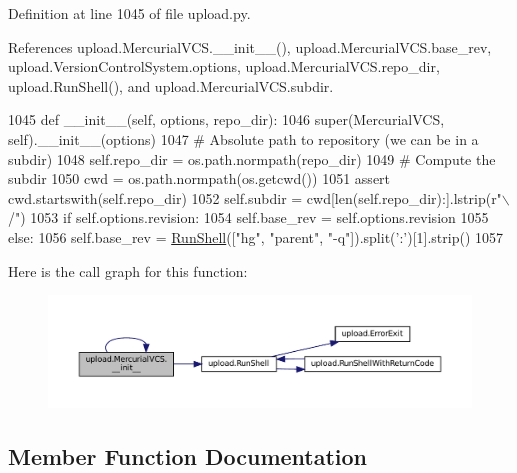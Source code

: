 Definition at line 1045 of file upload.\+py.



References upload.\+Mercurial\+V\+C\+S.\+\_\+\+\_\+init\+\_\+\+\_\+(), upload.\+Mercurial\+V\+C\+S.\+base\+\_\+rev, upload.\+Version\+Control\+System.\+options, upload.\+Mercurial\+V\+C\+S.\+repo\+\_\+dir, upload.\+Run\+Shell(), and upload.\+Mercurial\+V\+C\+S.\+subdir.


\begin{DoxyCode}
1045   \textcolor{keyword}{def }\_\_init\_\_(self, options, repo\_dir):
1046     super(MercurialVCS, self).\_\_init\_\_(options)
1047     \textcolor{comment}{# Absolute path to repository (we can be in a subdir)}
1048     self.repo\_dir = os.path.normpath(repo\_dir)
1049     \textcolor{comment}{# Compute the subdir}
1050     cwd = os.path.normpath(os.getcwd())
1051     \textcolor{keyword}{assert} cwd.startswith(self.repo\_dir)
1052     self.subdir = cwd[len(self.repo\_dir):].lstrip(\textcolor{stringliteral}{r"\(\backslash\)/"})
1053     \textcolor{keywordflow}{if} self.options.revision:
1054       self.base\_rev = self.options.revision
1055     \textcolor{keywordflow}{else}:
1056       self.base\_rev = \hyperlink{namespaceupload_adddc423c49132e8879cbb25d6be2cf11}{RunShell}([\textcolor{stringliteral}{"hg"}, \textcolor{stringliteral}{"parent"}, \textcolor{stringliteral}{"-q"}]).split(\textcolor{stringliteral}{':'})[1].strip()
1057 
\end{DoxyCode}
Here is the call graph for this function\+:
\nopagebreak
\begin{figure}[H]
\begin{center}
\leavevmode
\includegraphics[width=350pt]{classupload_1_1MercurialVCS_a33890f442dedbb7d9fd45c08b5baed56_cgraph}
\end{center}
\end{figure}


\subsection{Member Function Documentation}
\mbox{\label{classupload_1_1MercurialVCS_a140da653b63106c4fa825f3ef5bf7701}} 
